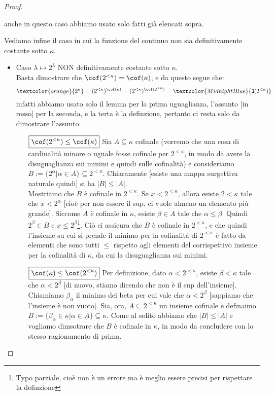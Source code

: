 \documentclass[11pt]{scrartcl}
\begin{document}
\begin{proof}
\begin{itemize}
\[			\]
		anche in questo caso abbiamo usato solo fatti già elencati sopra.
	\end{itemize}
	Vediamo infine il caso in cui la funzione del continuo non sia definitivamente costante sotto $\kappa$.
	\begin{itemize}
		\item Caso $\lambda \mapsto 2^\lambda$ NON definitivamente costante sotto $\kappa$.\\
		Basta dimostrare che \textcolor{red}{$\cof(2^{<\kappa}) = \cof(\kappa)$}, e da questo segue che:
		\[ \textcolor{orange}{2^\kappa} = (2^{<\kappa})^{\cof(\kappa)} = (2^{<\kappa})^{\cof(2^{<\kappa})} = \textcolor{MidnightBlue}{\gimel(2^{<\kappa})}
			\]
		infatti abbiamo usato solo il lemma per la prima uguaglianza, l'assunto [in rosso] per la seconda, e la terta è la definzione, pertanto ci resta solo da dimostrare l'assunto.
		\begin{itemize}
			\item[$\boxed{\cof(2^{<\kappa}) \leq \cof(\kappa)}$] Sia $A \subseteq \kappa$ cofinale (vorremo che una cosa di cardinalità minore o uguale fosse cofinale per $2^{<\kappa}$, in modo da avere la disuguaglianza sui minimi e quindi sulle cofinalità) e consideriamo $B:=\{2^{\alpha} | \alpha \in A\}\subseteq 2^{<\kappa}$. Chiaramente [esiste una mappa surgettiva naturale quindi] si ha $|B|\leq|A|$.\\
			Mostriamo che $B$ è cofinale in $2^{<\kappa}$. Se $x < 2^{<\kappa}$, allora esiste $2 < \kappa$ tale che $x < 2^\alpha$ [cioè per non essere il sup, ci vuole almeno un elemento più grande]. Siccome $A$ è cofinale in $\kappa$, esiste $\beta \in A$ tale che $\alpha \leq \beta$. Quindi $2^\beta \in B$ e $x \leq 2^{\beta}$\footnote{Typo parziale, cioè non è un errore ma è meglio essere precisi per rispettare la definzione}.
			Ciò ci assicura che $B$ è cofinale in $2^{<\kappa}$, e che quindi l'insieme su cui si prende il minimo per la cofinalità di $2^{<\kappa}$ è fatto da elementi che sono tutti $\leq$ rispetto agli elementi del corrispettivo insieme per la cofinalità di $\kappa$, da cui la disuguaglianza sui minimi.
			\item[$\boxed{\cof(\kappa) \leq \cof(2^{<\kappa})}$] Per definizione, dato $\alpha < 2^{<\kappa}$, esiste $\beta < \kappa$ tale che $\alpha < 2^\beta$ [di nuovo, stiamo dicendo che non è il sup dell'insieme]. Chiamiamo $\beta_\alpha$ il minimo dei beta per cui vale che $\alpha < 2^\beta$ [sappiamo che l'insieme è non vuoto].
			Sia, ora, $A \subseteq 2^{<\kappa}$ un insieme cofinale e definaimo $B :=\{\beta_\alpha \in \kappa| \alpha \in A\} \subseteq \kappa$. Come al solito abbiamo che $|B|\leq|A|$ e vogliamo dimsotrare che $B$ è cofinale in $\kappa$, in modo da concludere con lo stesso ragionamento di prima.\\

\end{itemize}
\end{itemize}
\end{proof}
\end{document}
